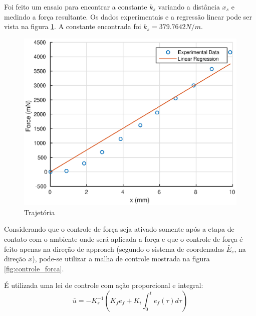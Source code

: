 Foi feito um ensaio para encontrar a constante $k_s$ variando a distância $x_s$ e medindo a força resultante. Os dados experimentais e a regressão linear pode ser vista na figura \ref{fig:ks_linreg}. A constante encontrada foi $k_s = 379.7642 N/m$.

\begin{figure}[!ht]
\centering
  \includegraphics[width=0.5\linewidth]{./img/ks_estimation.eps}
  \caption{Trajetória}
  \label{fig:ks_linreg}
\end{figure}%


Considerando que o controle de força seja ativado somente após a etapa de contato com o ambiente onde será aplicada a força e que o controle de força é feito apenas na direção de approach (segundo o sistema de coordenadas $\bar{E}_e$, na direção $x$), pode-se utilizar a malha de controle mostrada na figura \ref{fig:controle_forca}.

É utilizada uma lei de controle com ação proporcional e integral:
\begin{equation}
\bar{u} = -K_s^{-1} (K_fe_f + K_i \int_0^t e_f(\tau)d\tau)
\end{equation}


